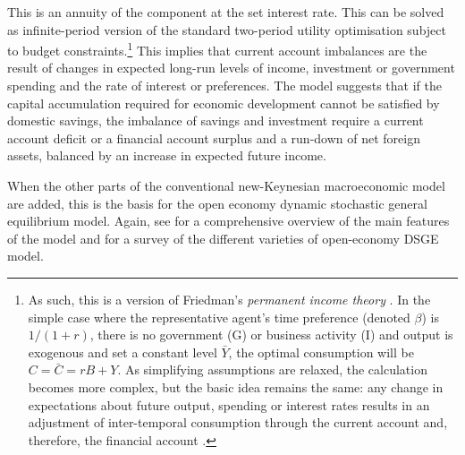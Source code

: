 \documentclass[12pt, a4paper, oneside]{article}\usepackage[]{graphicx}\usepackage[]{color}
\begin{document}
This is an annuity of the component at the set interest rate.  This can be solved as infinite-period version of the standard two-period utility optimisation subject to budget constraints.\footnote{As such, this is a version of Friedman's \emph{permanent income theory} \citep{FriedmanConsumption}.  In the simple case where the representative agent's time preference (denoted $\beta$) is $1/(1+r)$, there is no government (G) or business activity (I) and output is exogenous and set a constant level $\bar{Y}$, the optimal consumption will be $C = \bar{C} =rB + Y$.  As simplifying assumptions are relaxed, the calculation becomes more complex, but the basic idea remains the same: any change in expectations about future output, spending or interest rates results in an adjustment of inter-temporal consumption through the current account and, therefore, the financial account \citep[pp. 59-89]{OandR}.}    This implies that current account imbalances are the result of changes in expected long-run levels of income, investment or government spending and the rate of interest or preferences.   The model suggests that if the capital accumulation required for economic development cannot be satisfied by domestic savings, the imbalance of savings and investment require a current account deficit or a financial account surplus and a run-down of net foreign assets, balanced by an increase in expected future income. 

When the other parts of the conventional new-Keynesian macroeconomic model are added, this is the basis for the open economy dynamic stochastic general equilibrium model.  Again, see \citep{Obstfeld1995Redux} for a comprehensive overview of the main features of the model and \citep{Lane2001} for a survey of the different varieties of open-economy DSGE model. 
\end{document}
